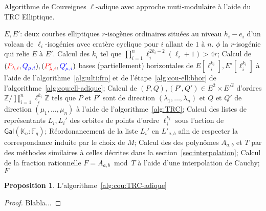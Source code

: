 \documentclass[10pt,a4paper]{book}
\theoremstyle{plain}
\theoremstyle{definition}
\theoremstyle{definition}
\theoremstyle{definition}
\newtheorem{prop}[thm]{Proposition}
\theoremstyle{definition}
\theoremstyle{remark}
\theoremstyle{remark}
\theoremstyle{definition}
\begin{document}
\begin{algorithm}
\caption{\label{alg:cou:TRC-adique} Algorithme de Couveignes $\ell$-adique avec approche muti-modulaire à l'aide du TRC Elliptique.}
\begin{algorithmic}[1]
\REQUIRE $E,E'$: deux courbes elliptiques $r$-isogènes ordinaires situées au niveau $h_i-e_i$ d'un volcan de $\ell_i$-isogénies avec cratère cyclique pour $i$ allant de $1$ à $n$.
\ENSURE $\phi$ la $r$-isogénie qui relie $E$ à $E'$.
\STATE Calcul des $k_i$ tel que $\prod_{i=1}^n\ell_{i}^{2k_{i}-2}(\ell_{i}+1)>4r$;
\STATE \label{alg:cou:TRC-adique:bhor} Calcul de $(\color{red}P_{\lambda,i}\color{black},\color{blue}Q_{\mu,i}\color{black}),(\color{red}P'_{\lambda,i}\color{black},\color{blue}Q_{\mu,i}'\color{black})$ bases (partiellement) horizontales de $E[\ell_i^{k_i}],E'[\ell_i^{k_i}]$ à l'aide de l'algorithme~\ref{alg:ulti:fro} et de l'étape~\ref{alg:cou-ell:bhor} de l'algorithme~\ref{alg:cou:ell-adique};
\ENDFOR
\STATE Calcul de $(P,Q),(P',Q') \in E^2 \times E'^2$ d'ordres $ \mathbb{Z}/\prod_{i=1}^n \ell_i^{k_i}\mathbb{Z}$ tels que $P$ et $P'$ sont de direction $(\lambda_1, \dots, \lambda_n)$ et $Q$ et $Q'$ de direction $(\mu_1, \dots, \mu_n)$ à l'aide de l'algorithme~\ref{alg:TRC};
\STATE \label{alg:mult-ell:rep} Calcul des listes de représentants $L_i,L_i'$ des orbites de points d'ordre $\ell_i^{k_i}$ sous l'action de $\mathsf{Gal}(\mathbb{K}_n:\mathbb{F}_q)$;
\STATE \label{alg:mult-ell:ord} Réordonancement de la liste $L_i'$ en $L'_{a,b}$ afin de respecter la correspondance induite par le choix de $M$;
\STATE \label{alg:mult-ell:int} Calcul des des polynômes $A_{a,b}$ et $T$ par des méthodes similaires à celles décrites dans la section~\ref{sec:interpolation};
\STATE \label{alg:mult-ell:Cauchy} Calcul de la fraction rationnelle $F=A_{a,b} \bmod T$ à l'aide d'une interpolation de Cauchy;
\RETURN $F$
\ENDIF
\ENDFOR 
\end{algorithmic}
\end{algorithm}

\begin{prop}
L'algorithme~\ref{alg:cou:TRC-adique}
\end{prop}

\begin{proof}
Blabla...
\end{proof}
\end{document}
